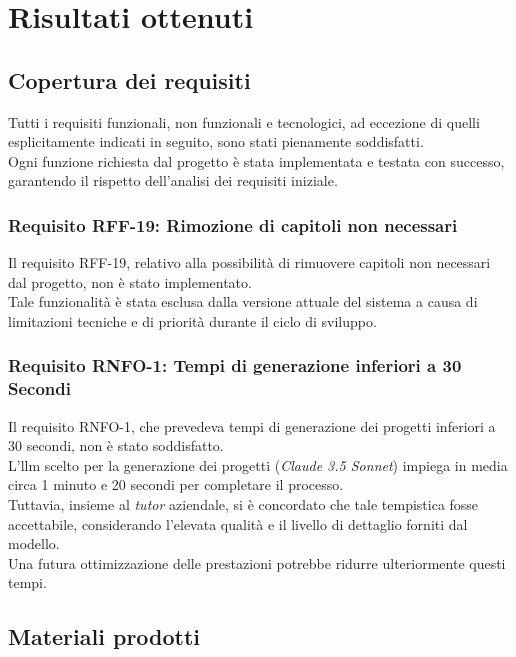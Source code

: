 \section{Risultati ottenuti}
\label{sez:risultati-ottenuti}


\pagebreak
\subsection{Copertura dei requisiti}
\label{subsec:copertura-requisiti}

Tutti i requisiti funzionali, non funzionali e tecnologici, ad eccezione di quelli esplicitamente indicati in seguito, sono stati pienamente soddisfatti.\\
Ogni funzione richiesta dal progetto è stata implementata e testata con successo, garantendo il rispetto dell'analisi dei requisiti iniziale.

\subsubsection{Requisito RFF-19: Rimozione di capitoli non necessari}
\noindent Il requisito RFF-19, relativo alla possibilità di rimuovere capitoli non necessari dal progetto, non è stato implementato.\\
Tale funzionalità è stata esclusa dalla versione attuale del sistema a causa di limitazioni tecniche e di priorità durante il ciclo di sviluppo.

\subsubsection{Requisito RNFO-1: Tempi di generazione inferiori a 30 Secondi}
\noindent Il requisito RNFO-1, che prevedeva tempi di generazione dei progetti inferiori a 30 secondi, non è stato soddisfatto.\\
L'\gls{llm} scelto per la generazione dei progetti (\textit{Claude 3.5 Sonnet}) impiega in media circa 1 minuto e 20 secondi per completare il processo.\\
Tuttavia, insieme al \textit{tutor} aziendale, si è concordato che tale tempistica fosse accettabile, considerando l'elevata qualità e il livello di dettaglio forniti dal modello.\\
Una futura ottimizzazione delle prestazioni potrebbe ridurre ulteriormente questi tempi.

\subsection{Materiali prodotti}
\label{subsec:materiali-prodotti}

